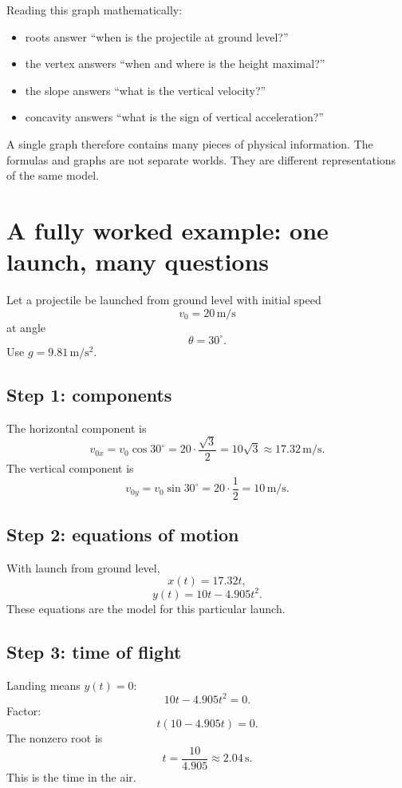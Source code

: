 \documentclass[11pt,a4paper]{article}
\begin{document}
Reading this graph mathematically:
\begin{itemize}
    \item roots answer ``when is the projectile at ground level?''
    \item the vertex answers ``when and where is the height maximal?''
    \item the slope answers ``what is the vertical velocity?''
    \item concavity answers ``what is the sign of vertical acceleration?''
\end{itemize}

A single graph therefore contains many pieces of physical information. The formulas and graphs are not separate worlds. They are different representations of the same model.

\section{A fully worked example: one launch, many questions}

Let a projectile be launched from ground level with initial speed
\[
v_0=20\,\mathrm{m/s}
\]
at angle
\[
\theta=30^\circ.
\]
Use $g=9.81\,\mathrm{m/s^2}$.

\subsection{Step 1: components}

The horizontal component is
\[
v_{0x}=v_0\cos30^\circ=20\cdot\frac{\sqrt3}{2}=10\sqrt3\approx17.32\,\mathrm{m/s}.
\]
The vertical component is
\[
v_{0y}=v_0\sin30^\circ=20\cdot\frac12=10\,\mathrm{m/s}.
\]

\subsection{Step 2: equations of motion}

With launch from ground level,
\[
x(t)=17.32t,
\]
\[
y(t)=10t-4.905t^2.
\]
These equations are the model for this particular launch.

\subsection{Step 3: time of flight}

Landing means $y(t)=0$:
\[
10t-4.905t^2=0.
\]
Factor:
\[
t(10-4.905t)=0.
\]
The nonzero root is
\[
t=\frac{10}{4.905}\approx2.04\,\mathrm{s}.
\]
This is the time in the air.
\end{document}
